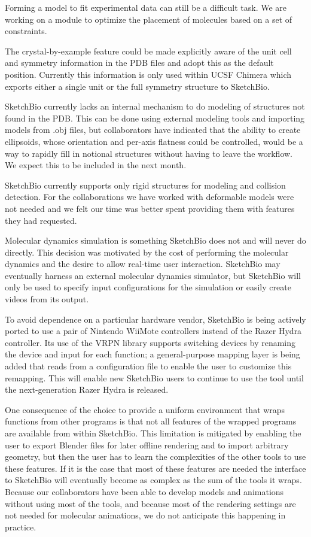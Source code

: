 \documentclass[twocolumn]{bmcart}%
\begin{document}
Forming a model to fit experimental data can still be a difficult task.  We are working on a module to optimize the placement of molecules based on a set of constraints.

The crystal-by-example feature could be made explicitly aware of the unit cell and symmetry information in the PDB files and adopt this as the default position.
Currently this information is only used within UCSF Chimera which exports either a single unit or the full symmetry structure to SketchBio.

SketchBio currently lacks an internal mechanism to do modeling of structures not found in the PDB.
This can be done using external modeling tools and importing models from .obj files, but collaborators have indicated that the ability to create ellipsoids, whose orientation and per-axis flatness could be controlled, would be a way to rapidly fill in notional structures without having to leave the workflow.
We expect this to be included in the next month.

SketchBio currently supports only rigid structures for modeling and collision detection.
For the collaborations we have worked with deformable models were not needed and we felt our time was better spent providing them with features they had requested.

Molecular dynamics simulation is something SketchBio does not and will never do directly.
This decision was motivated by the cost of performing the molecular dynamics and the desire to allow real-time user interaction.
SketchBio may eventually harness an external molecular dynamics simulator, but SketchBio will only be used to specify input configurations for the simulation or easily create videos from its output.

To avoid dependence on a particular hardware vendor, SketchBio is being actively ported to use a pair of Nintendo WiiMote controllers instead of the Razer Hydra controller.
Its use of the VRPN library supports switching devices by renaming the device and input for each function; a general-purpose mapping layer is being added that reads from a configuration file to enable the user to customize this remapping.
This will enable new SketchBio users to continue to use the tool until the next-generation Razer Hydra is released.

One consequence of the choice to provide a uniform environment that wraps functions from other programs is that not all features of the wrapped programs are available from within SketchBio. This limitation is mitigated by enabling the user to export Blender files for later offline rendering and to import arbitrary geometry, but then the user has to learn the complexities of the other tools to use these features. If it is the case that most of these features are needed the interface to SketchBio will eventually become as complex as the sum of the tools it wraps. Because our collaborators have been able to develop models and animations without using most of the tools, and because most of the rendering settings are not needed for molecular animations, we do not anticipate this happening in practice.
\end{document}
